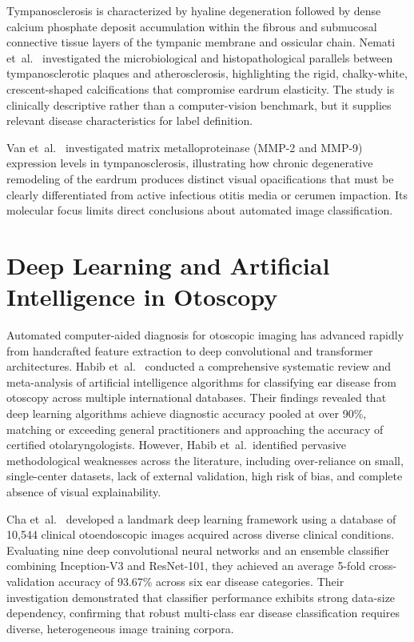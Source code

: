 \documentclass[12pt,a4paper]{report}
\begin{document}
Tympanosclerosis is characterized by hyaline degeneration followed by dense calcium phosphate deposit accumulation within the fibrous and submucosal connective tissue layers of the tympanic membrane and ossicular chain. Nemati et~al.~\cite{ref_nemati2021_tympanosclerosis} investigated the microbiological and histopathological parallels between tympanosclerotic plaques and atherosclerosis, highlighting the rigid, chalky-white, crescent-shaped calcifications that compromise eardrum elasticity. The study is clinically descriptive rather than a computer-vision benchmark, but it supplies relevant disease characteristics for label definition.

Van et~al.~\cite{ref_van2025_tympanosclerosis} investigated matrix metalloproteinase (MMP-2 and MMP-9) expression levels in tympanosclerosis, illustrating how chronic degenerative remodeling of the eardrum produces distinct visual opacifications that must be clearly differentiated from active infectious otitis media or cerumen impaction. Its molecular focus limits direct conclusions about automated image classification.

\section{Deep Learning and Artificial Intelligence in Otoscopy}
Automated computer-aided diagnosis for otoscopic imaging has advanced rapidly from handcrafted feature extraction to deep convolutional and transformer architectures. Habib et~al.~\cite{ref_habib2022_ai_otoscopy} conducted a comprehensive systematic review and meta-analysis of artificial intelligence algorithms for classifying ear disease from otoscopy across multiple international databases. Their findings revealed that deep learning algorithms achieve diagnostic accuracy pooled at over 90\%, matching or exceeding general practitioners and approaching the accuracy of certified otolaryngologists. However, Habib et~al.\ identified pervasive methodological weaknesses across the literature, including over-reliance on small, single-center datasets, lack of external validation, high risk of bias, and complete absence of visual explainability.

Cha et~al.~\cite{ref_cha2019_ensemble} developed a landmark deep learning framework using a database of 10,544 clinical otoendoscopic images acquired across diverse clinical conditions. Evaluating nine deep convolutional neural networks and an ensemble classifier combining Inception-V3 and ResNet-101, they achieved an average 5-fold cross-validation accuracy of 93.67\% across six ear disease categories. Their investigation demonstrated that classifier performance exhibits strong data-size dependency, confirming that robust multi-class ear disease classification requires diverse, heterogeneous image training corpora.
\end{document}

